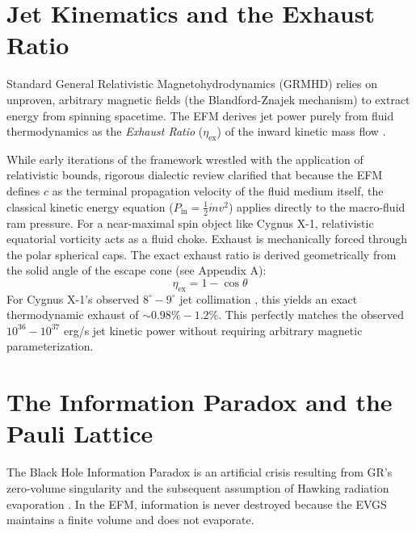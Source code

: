 \documentclass[11pt, a4paper]{article}
\begin{document}
\section{Jet Kinematics and the Exhaust Ratio}
Standard General Relativistic Magnetohydrodynamics (GRMHD) relies on unproven, arbitrary magnetic fields (the Blandford-Znajek mechanism) to extract energy from spinning spacetime. The EFM derives jet power purely from fluid thermodynamics as the \textit{Exhaust Ratio} ($\eta_{\text{ex}}$) of the inward kinetic mass flow \cite{marabut2026m3}.

While early iterations of the framework wrestled with the application of relativistic bounds, rigorous dialectic review clarified that because the EFM defines $c$ as the terminal propagation velocity of the fluid medium itself, the classical kinetic energy equation ($P_{\text{in}} = \frac{1}{2}\dot{m}v^2$) applies directly to the macro-fluid ram pressure. For a near-maximal spin object like Cygnus X-1, relativistic equatorial vorticity acts as a fluid choke. Exhaust is mechanically forced through the polar spherical caps. The exact exhaust ratio is derived geometrically from the solid angle of the escape cone (see Appendix A):
\begin{equation}
  \eta_{\text{ex}} = 1 - \cos\theta
\end{equation}
For Cygnus X-1's observed $8^\circ - 9^\circ$ jet collimation \cite{prabu2026}, this yields an exact thermodynamic exhaust of $\sim 0.98\% - 1.2\%$. This perfectly matches the observed $10^{36} - 10^{37}$ erg/s jet kinetic power without requiring arbitrary magnetic parameterization.

\section{The Information Paradox and the Pauli Lattice}
The Black Hole Information Paradox is an artificial crisis resulting from GR's zero-volume singularity and the subsequent assumption of Hawking radiation evaporation \cite{hawking1976}. In the EFM, information is never destroyed because the EVGS maintains a finite volume and does not evaporate.
\end{document}
